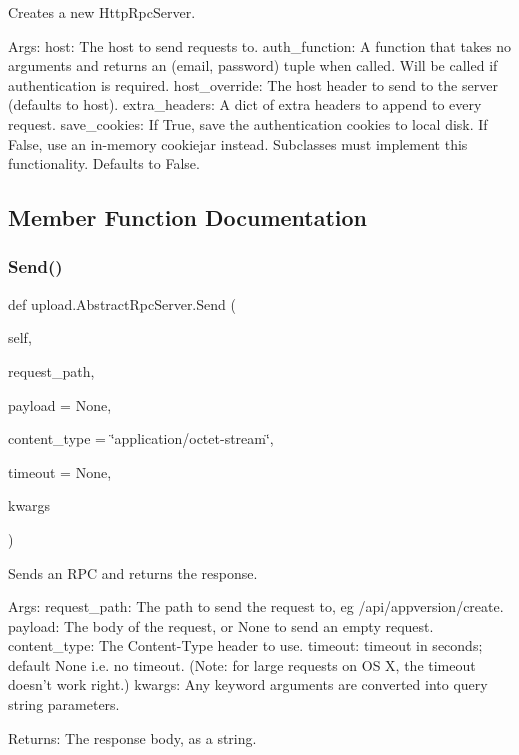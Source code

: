 \begin{DoxyVerb}Creates a new HttpRpcServer.

Args:
  host: The host to send requests to.
  auth_function: A function that takes no arguments and returns an
(email, password) tuple when called. Will be called if authentication
is required.
  host_override: The host header to send to the server (defaults to host).
  extra_headers: A dict of extra headers to append to every request.
  save_cookies: If True, save the authentication cookies to local disk.
If False, use an in-memory cookiejar instead.  Subclasses must
implement this functionality.  Defaults to False.
\end{DoxyVerb}
 

\subsection{Member Function Documentation}
\mbox{\label{classupload_1_1_abstract_rpc_server_ac1b913f8bd00da4741c47ab49ea94cb5}} 
\subsubsection{\texorpdfstring{Send()}{Send()}\hspace{0.1cm}{\footnotesize\ttfamily [1/2]}}
{\footnotesize\ttfamily def upload.\+Abstract\+Rpc\+Server.\+Send (\begin{DoxyParamCaption}\item[{}]{self,  }\item[{}]{request\+\_\+path,  }\item[{}]{payload = {\ttfamily None},  }\item[{}]{content\+\_\+type = {\ttfamily \char`\"{}application/octet-\/stream\char`\"{}},  }\item[{}]{timeout = {\ttfamily None},  }\item[{}]{kwargs }\end{DoxyParamCaption})}

\begin{DoxyVerb}Sends an RPC and returns the response.

Args:
  request_path: The path to send the request to, eg /api/appversion/create.
  payload: The body of the request, or None to send an empty request.
  content_type: The Content-Type header to use.
  timeout: timeout in seconds; default None i.e. no timeout.
(Note: for large requests on OS X, the timeout doesn't work right.)
  kwargs: Any keyword arguments are converted into query string parameters.

Returns:
  The response body, as a string.
\end{DoxyVerb}
 \mbox{\label{classupload_1_1_abstract_rpc_server_ac1b913f8bd00da4741c47ab49ea94cb5}} 

